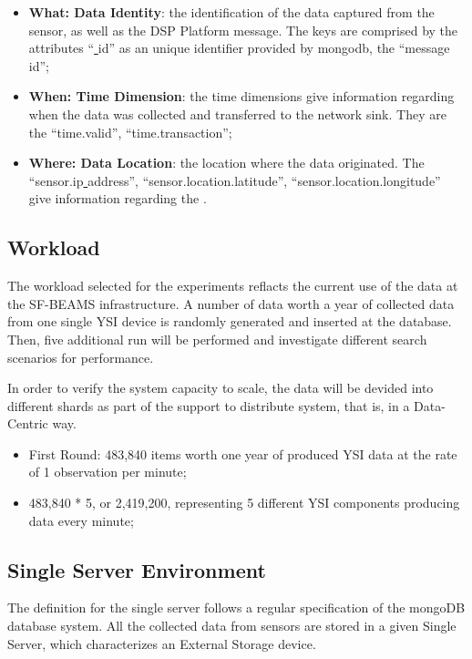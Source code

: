 \begin{itemize}
  \item \textbf{What: Data Identity}: the identification of the data captured
  from the sensor, as well as the DSP Platform message. The keys are comprised
  by the attributes ``\underline{ }id'' as an unique identifier provided by
  mongodb, the ``message\underline{ }id'';
  \item \textbf{When: Time Dimension}: the time dimensions give information
  regarding when the data was collected and transferred to the network sink.
  They are the ``time.valid'', ``time.transaction'';
  \item \textbf{Where: Data Location}: the location where 
 the data originated. The ``sensor.ip\underline{ }address'',
 ``sensor.location.latitude'', ``sensor.location.longitude'' give information
 regarding the .
\end{itemize}

\subsection{Workload}

The workload selected for the experiments reflacts the current use of the data
at the SF-BEAMS infrastructure. A number of data worth a year of collected data
from one single YSI device is randomly generated and inserted at the database.
Then, five additional run will be performed and investigate different search
scenarios for performance.

In order to verify the system capacity to scale, the data will be devided into
different shards as part of the support to distribute system, that is, in a
Data-Centric way.

\begin{itemize}
  \item First Round: 483,840 items worth one year of produced YSI data at the
  rate of 1 observation per minute;
  \item 483,840 * 5, or 2,419,200, representing 5 different YSI components
  producing data every minute;
\end{itemize}

\subsection{Single Server Environment}

The definition for the single server follows a regular specification of the
mongoDB database system. All the collected data from sensors are stored in a
given Single Server, which characterizes an External Storage device.

